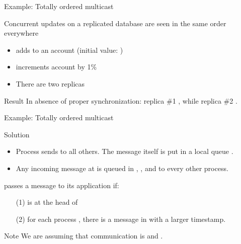 \begin{slide}{Example: Totally ordered multicast}
  \begin{block}{Concurrent updates on a replicated database are seen in the same order everywhere}
    \begin{itemize}\tightlist
    \item {} adds  to an account (initial value: )
    \item {} increments account by 1\%
    \item There are two replicas
    \end{itemize}
    \begin{center}
    \end{center}
  \end{block}
  \begin{block}{Result} 
    In absence of proper synchronization: \newline replica \#1 \mathexpr{\leftarrow} , while
    replica \#2 \mathexpr{\leftarrow} .
  \end{block}
\end{slide}
\begin{slide}{Example: Totally ordered multicast}
  \begin{block}{Solution}
    \begin{itemize}\tightlist
    \item Process  sends   to all others. The message itself is put in a
      local queue .
    \item Any incoming message at  is queued in , , and
       to every other process.
    \end{itemize}
  \end{block}
  \begin{alertblock}{ passes a message  to its application if:}
    \begin{itemize}\tightlist
    \item[(1)]  is at the head of 
    \item[(2)] for each process , there is a message  in  with a larger
      timestamp.
    \end{itemize}
  \end{alertblock}
  \begin{block}{Note}
    We are assuming that communication is  and .
  \end{block}
\end{slide}
